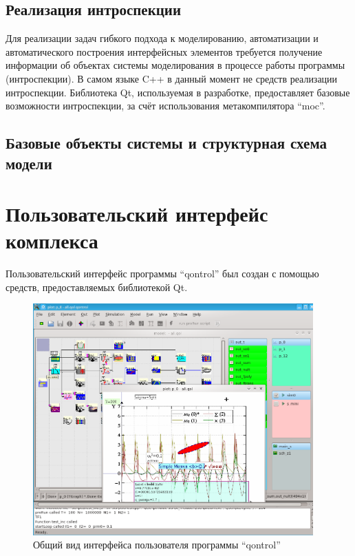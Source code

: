 \subsection{Реализация интроспекции}  %

Для реализации задач гибкого подхода к моделированию, автоматизации
и автоматического построения интерфейсных элементов
требуется получение информации об объектах системы моделирования
в процессе работы программы (интроспекции).
В самом языке C++ в данный момент не средств реализации интроспекции.
Библиотека Qt, используемая в разработке, предоставляет
базовые возможности интроспекции, за счёт использования метакомпилятора ``moc''.



\subsection{Базовые объекты системы и структурная схема модели}  %







\section{Пользовательский интерфейс комплекса} %

Пользовательский интерфейс программы ``qontrol'' был создан с помощью
средств, предоставляемых библиотекой Qt.

\begin{figure}[htb!]
  \begin{center}
    \includegraphics[width=0.96\textwidth]{p/qontrol_all.png}
  \end{center}
  \caption{Общий вид интерфейса пользователя программы ``qontrol''}
  \label{atu:f:qontrol_all}
\end{figure}



